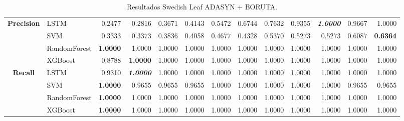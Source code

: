 \begin{table}[H]
\begin{adjustbox}{max width=14cm}
\begin{tabular}{|c|l|r|r|r|r|r|r|r|r|r|r|r|}
		\hline
		\textbf{Precision} &  LSTM &  0.2477 &  0.2816 &  0.3671 &  0.4143 &  0.5472 &  0.6744 &  0.7632 &  0.9355 & \textit{ \textbf{  1.0000 } } &  0.9667 &  1.0000 \\
		&  SVM &  0.3333 &  0.3373 &  0.3836 &  0.4058 &  0.4677 &  0.4328 &  0.5370 &  0.5273 &  0.5273 &  0.6087 & \textbf{  0.6364 } \\
		&  RandomForest & \textbf{  1.0000 } &  1.0000 &  1.0000 &  1.0000 &  1.0000 &  1.0000 &  1.0000 &  1.0000 &  1.0000 &  1.0000 &  1.0000 \\
		&  XGBoost &  0.8788 & \textbf{  1.0000 } &  1.0000 &  1.0000 &  1.0000 &  1.0000 &  1.0000 &  1.0000 &  1.0000 &  1.0000 &  1.0000 \\
		\hline
		\textbf{Recall} &  LSTM &  0.9310 & \textit{ \textbf{  1.0000 } } &  1.0000 &  1.0000 &  1.0000 &  1.0000 &  1.0000 &  1.0000 &  1.0000 &  1.0000 &  1.0000 \\
		&  SVM & \textbf{  1.0000 } &  0.9655 &  0.9655 &  0.9655 &  1.0000 &  1.0000 &  1.0000 &  1.0000 &  1.0000 &  0.9655 &  0.9655 \\
		&  RandomForest & \textbf{  1.0000 } &  1.0000 &  1.0000 &  1.0000 &  1.0000 &  1.0000 &  1.0000 &  1.0000 &  1.0000 &  1.0000 &  1.0000 \\
		&  XGBoost & \textbf{  1.0000 } &  1.0000 &  1.0000 &  1.0000 &  1.0000 &  1.0000 &  1.0000 &  1.0000 &  1.0000 &  1.0000 &  1.0000 \\
		\hline
	\end{tabular}
\end{adjustbox}
\caption{Resultados Swedish Leaf ADASYN + BORUTA.}
\label{tab:SLeaf_ADASYN_BORUTA}
\end{table}

